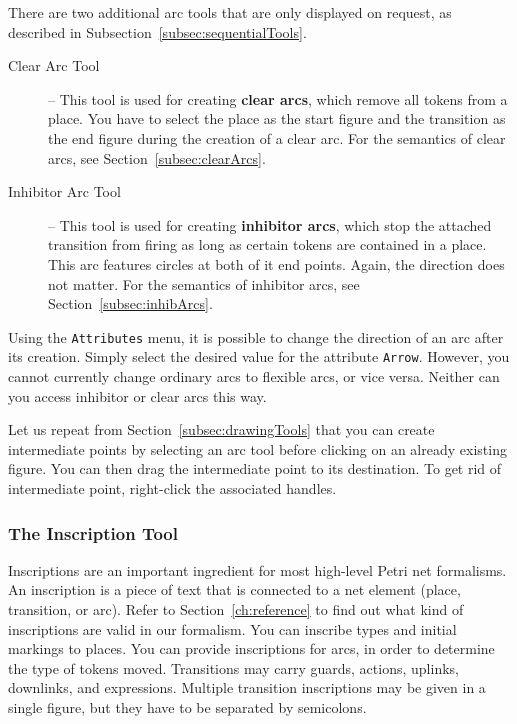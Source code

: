 There are two additional arc tools that are only displayed
on request, as described in
Subsection~\ref{subsec:sequentialTools}.
\begin{description}
\item[Clear Arc Tool]
-- This tool is used for creating {\bf clear arcs}, which
remove all tokens from a place. You have to select the place as
the start figure and the transition as the end figure
during the creation of a clear arc. For the semantics of clear arcs, see
Section~\ref{subsec:clearArcs}.

\item[Inhibitor Arc Tool]
-- This tool is used for creating {\bf inhibitor arcs}, which
stop the attached transition from firing as long as certain tokens
are contained in a place. This arc features circles at both
of it end points. Again, the direction does
not matter. For the semantics of inhibitor arcs, see
Section~\ref{subsec:inhibArcs}.
\end{description}

Using the \texttt{Attributes} menu, it is possible to
change the direction of an arc after its creation.
Simply select the desired value for the attribute
\texttt{Arrow}. However, you cannot currently change ordinary
arcs to flexible arcs, or vice versa. Neither can you access
inhibitor or clear arcs this way.

Let us repeat from Section~\ref{subsec:drawingTools}
that you can create intermediate points by selecting an arc tool
before clicking on an already existing figure.
You can then drag the intermediate point to its destination.
To get rid of intermediate point, right-click the associated handles.

\subsubsection{The Inscription Tool}
\label{subsubsec:toolInscription}

Inscriptions are an important ingredient for most high-level
Petri net formalisms. An inscription is a piece of text that
is connected to a net element (place, transition, or arc).
Refer to Section~\ref{ch:reference} to find out what kind of
inscriptions are valid in our formalism. You can inscribe
types and initial markings to places. You can provide inscriptions
for arcs, in order to determine the type of tokens moved.
Transitions may carry guards, actions, uplinks, downlinks, and expressions.
Multiple transition inscriptions may be given in a single figure,
but they have to be separated by semicolons.

